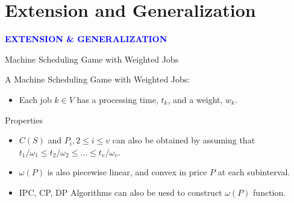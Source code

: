 \documentclass[14pt]{beamer}
\begin{document}
\section{Extension and Generalization}
\begin{frame}
\centering
\large
\textcolor{blue}{\bf {\huge E}XTENSION \&  {\huge G}ENERALIZATION}
\end{frame}

\begin{frame}{Machine Scheduling Game with Weighted Jobs}
	\begin{definition}
	\small
	\justifying
	A Machine Scheduling Game with Weighted Jobs:\\
	\begin{itemize}
		\justifying
			\item Each job $k \in V$ has a processing time, $t_k$, and a weight, $w_k$.
	\end{itemize}
	\end{definition}

	\begin{block}
		{Properties}
		\begin{itemize}
			\justifying
			\small
				\item $C(S)$ and $P_i, 2 \leq i \leq v$ can also be obtained by assuming that\\
				\quad $t_1/\omega_1 \leq t_2/\omega_2 \leq \ldots \leq t_v/\omega_v$.
				\vspace{2pt}
				\item ${\omega(P)}$ is also piecewise linear, and convex in price $P$ at each subinterval.
				\item IPC, CP, DP Algorithms can also be uesd to construct $\omega(P)$ function.
		\end{itemize}
	\end{block}


\end{frame}
\end{document}

